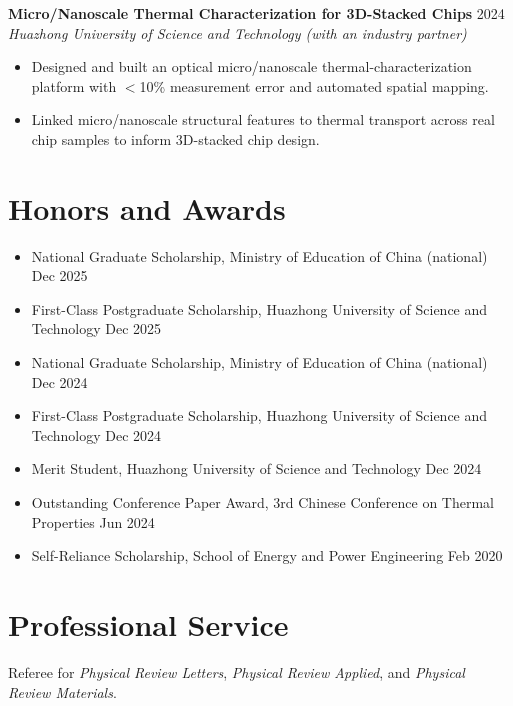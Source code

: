 \documentclass[10pt,a4paper]{article}
\begin{document}
\vspace{2pt}
\textbf{Micro/Nanoscale Thermal Characterization for 3D-Stacked Chips} \hfill 2024\\
\textit{Huazhong University of Science and Technology (with an industry partner)}
\begin{itemize}
  \item Designed and built an optical micro/nanoscale thermal-characterization platform with $<$10\% measurement error and automated spatial mapping.
  \item Linked micro/nanoscale structural features to thermal transport across real chip samples to inform 3D-stacked chip design.
\end{itemize}

\section{Honors and Awards}
\begin{itemize}[label={}, leftmargin=0pt, itemsep=2.5pt]
  \item National Graduate Scholarship, Ministry of Education of China (national) \hfill Dec 2025
  \item First-Class Postgraduate Scholarship, Huazhong University of Science and Technology \hfill Dec 2025
  \item National Graduate Scholarship, Ministry of Education of China (national) \hfill Dec 2024
  \item First-Class Postgraduate Scholarship, Huazhong University of Science and Technology \hfill Dec 2024
  \item Merit Student, Huazhong University of Science and Technology \hfill Dec 2024
  \item Outstanding Conference Paper Award, 3rd Chinese Conference on Thermal Properties \hfill Jun 2024
  \item Self-Reliance Scholarship, School of Energy and Power Engineering \hfill Feb 2020
\end{itemize}

\section{Professional Service}
Referee for \textit{Physical Review Letters}, \textit{Physical Review Applied}, and \textit{Physical Review Materials}.
\end{document}
